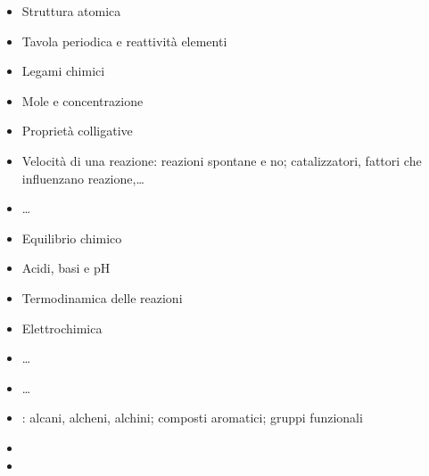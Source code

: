 \documentclass[letterpaper,10pt,english]{jupyterBook}
\begin{document}
\sphinxAtStartPar
{}
\begin{itemize}
\item {} 
\sphinxAtStartPar
Struttura atomica

\item {} 
\sphinxAtStartPar
Tavola periodica e reattività elementi

\item {} 
\sphinxAtStartPar
Legami chimici

\item {} 
\sphinxAtStartPar
Mole e concentrazione

\item {} 
\sphinxAtStartPar
Proprietà colligative

\item {} 
\sphinxAtStartPar
Velocità di una reazione: reazioni spontane e no; catalizzatori, fattori che influenzano reazione,…

\item {} 
\sphinxAtStartPar
{}…

\end{itemize}

\sphinxAtStartPar
{}
\begin{itemize}
\item {} 
\sphinxAtStartPar
Equilibrio chimico

\item {} 
\sphinxAtStartPar
Acidi, basi e pH

\item {} 
\sphinxAtStartPar
Termodinamica delle reazioni

\item {} 
\sphinxAtStartPar
Elettrochimica

\item {} 
\sphinxAtStartPar
{}…

\item {} 
\sphinxAtStartPar
{}…

\end{itemize}

\sphinxAtStartPar
{}
\begin{itemize}
\item {} 
\sphinxAtStartPar
{}: alcani, alcheni, alchini; composti aromatici; gruppi funzionali

\item {} 
\sphinxAtStartPar
{}

\item {} 
\sphinxAtStartPar
{}

\end{itemize}
\end{document}
